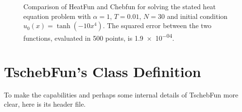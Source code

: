 \documentclass[12pt, a4paper]{article}
\newcommand{\tschebfun}{\textcolor{themecolor3}{TschebFun}\xspace}
\newcommand{\heatfun}{\textcolor{themecolor3}{HeatFun}\xspace}
\begin{document}
  \begin{figure}[H]
    \centering
    \caption{Comparison of \heatfun and Chebfun for solving the stated heat equation problem with $\alpha = 1$, $T = 0.01$, $N = 30$ and initial condition $u_0(x) = \tanh(-10x^4)$. The squared error between the two functions, evaluated in 500 points, is \num{1.9e-04}.}
  \end{figure}

  \section{TschebFun's Class Definition}
  To make the capabilities and perhaps some internal details of \tschebfun more clear, here is its header file.
  \inputminted{cpp}{../solver/TschebFun.h}
\end{document}

